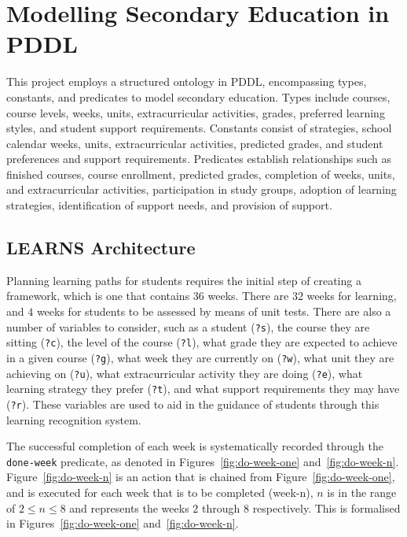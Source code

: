 \section{Modelling Secondary Education in PDDL}
This project employs a structured ontology in PDDL, encompassing types, constants, and predicates to model secondary education. Types include courses, course levels, weeks, units, extracurricular activities, grades, preferred learning styles, and student support requirements. Constants consist of strategies, school calendar weeks, units, extracurricular activities, predicted grades, and student preferences and support requirements. Predicates establish relationships such as finished courses, course enrollment, predicted grades, completion of weeks, units, and extracurricular activities, participation in study groups, adoption of learning strategies, identification of support needs, and provision of support.

\subsection{LEARNS Architecture}
Planning learning paths for students requires the initial step of creating a framework, which is one that contains 36 weeks. There are $32$ weeks for learning, and $4$ weeks for students to be assessed by means of unit tests. There are also a number of variables to consider, such as a student (\texttt{?s}), the course they are sitting (\texttt{?c}), the level of the course (\texttt{?l}), what grade they are expected to achieve in a given course (\texttt{?g}), what week they are currently on (\texttt{?w}), what unit they are achieving on (\texttt{?u}), what extracurricular activity they are doing (\texttt{?e}), what learning strategy they prefer (\texttt{?t}), and what support requirements they may have (\texttt{?r}). These variables are used to aid in the guidance of students through this learning recognition system.

The successful completion of each week is systematically recorded through the \texttt{done-week} predicate, as denoted in Figures~\ref{fig:do-week-one} and~\ref{fig:do-week-n}. Figure~\ref{fig:do-week-n} is an action that is chained from Figure~\ref{fig:do-week-one}, and is executed for each week that is to be completed (week-n), $n$ is in the range of $2 \leq n \leq 8$ and represents the weeks $2$ through $8$ respectively. This is formalised in Figures~\ref{fig:do-week-one} and~\ref{fig:do-week-n}.





